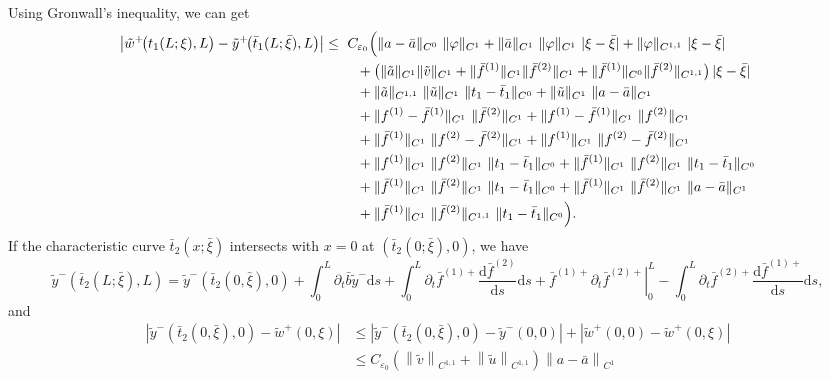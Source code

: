 \documentclass[a4paper,reqno,11pt]{amsart}
\numberwithin{equation}{section} %
\begin{document}
Using Gronwall's inequality, we can get
\[
\begin{aligned}
\bigl|\tilde w^+\!\bigl(t_1(L;\xi),L\bigr)-\tilde y ^+\!\bigl(\bar t_1(L;\bar\xi),L\bigr)\bigr|
\le{}&\ C_{\varepsilon_0}\Bigl(
  \|a-\bar a\|_{C^{0}}\ \|\varphi\|_{C^{1}}
  + \|\bar a\|_{C^{1}}\ \|\varphi\|_{C^{1}}\ |\xi-\bar\xi|
  + \|\varphi\|_{C^{1,1}}\ |\xi-\bar\xi|
\\
&\quad
  + \bigl(\|\tilde a\|_{C^{1}}\|\tilde v\|_{C^{1}}
     + \|\bar f^{(1)}\|_{C^{1}}\|\bar f^{(2)}\|_{C^{1}}
     + \|\bar f^{(1)}\|_{C^{0}}\|\bar f^{(2)}\|_{C^{1,1}}\bigr)\,|\xi-\bar\xi|
\\
&\quad
  + \|\tilde a\|_{C^{1,1}}\ \|\tilde u\|_{C^{1}}\ \|t_1-\bar t_1\|_{C^{0}}
  + \|\tilde u\|_{C^{1}}\ \|a-\bar a\|_{C^{1}}
\\
&\quad
  + \|f^{(1)}-\bar f^{(1)}\|_{C^{1}}\ \|\bar f^{(2)}\|_{C^{1}}
  + \|f^{(1)}-\bar f^{(1)}\|_{C^{1}}\ \|f^{(2)}\|_{C^{1}}
\\
&\quad
  + \|\bar f^{(1)}\|_{C^{1}}\ \|f^{(2)}-\bar f^{(2)}\|_{C^{1}}
  + \|f^{(1)}\|_{C^{1}}\ \|f^{(2)}-\bar f^{(2)}\|_{C^{1}}
\\
&\quad
  + \|f^{(1)}\|_{C^{1}}\ \|f^{(2)}\|_{C^{1}}\ \|t_1-\bar t_1\|_{C^{0}}
  + \|\bar f^{(1)}\|_{C^{1}}\ \|f^{(2)}\|_{C^{1}}\ \|t_1-\bar t_1\|_{C^{0}}
\\
&\quad
  + \|\bar f^{(1)}\|_{C^{1}}\ \|\bar f^{(2)}\|_{C^{1}}\ \|t_1-\bar t_1\|_{C^{0}}
  + \|\bar f^{(1)}\|_{C^{1}}\ \|\bar f^{(2)}\|_{C^{1}}\ \|a-\bar a\|_{C^{1}}
\\
&\quad
  + \|\bar f^{(1)}\|_{C^{1}}\ \|\bar f^{(2)}\|_{C^{1,1}}\ \|t_1-\bar t_1\|_{C^{0}}
\Bigr).
\end{aligned}
\]
If the characteristic curve $\bar{t} _2(x;\bar{\xi}  )$ intersects with $x=0$ at $(\bar{t}_2(0;\bar{\xi} ),0)$, we have
$$
\tilde{y}^-\left( \bar{t}_2(L;\bar{\xi}),L \right) =\tilde{y}^-(\bar{t}_2(0,\bar{\xi}),0)+\int_0^L{\partial _t\bar{b}\tilde{y}^-\mathrm{d}s}+\int_0^L{\partial _t\bar{f}^{(1)+}\frac{\mathrm{d}\bar{f}^{(2)}}{\mathrm{d}s}\mathrm{d}s}+\left. \bar{f}^{(1)+}\partial _t\bar{f}^{(2)+} \right|_{0}^{L}-\int_0^L{\partial _t{\bar{f}}^{(2)+}\frac{\mathrm{d}{\bar{f}}^{(1)+}}{\mathrm{d}s}\mathrm{d}s},
$$
and
$$
\begin{aligned}
	\left| \tilde{y}^-(\bar{t}_2(0,\bar{\xi}),0)-\tilde{w}^+(0,\xi ) \right|&\le \left| \tilde{y}^-(\bar{t}_2(0,\bar{\xi}),0)-\tilde{y}^-(0,0) \right|+\left| \tilde{w}^+(0,0)-\tilde{w}^+(0,\xi ) \right|\\
	&\le C_{\varepsilon _0}\left( \left\| \tilde{v} \right\| _{C^{1,1}}+\left\| \tilde{u} \right\| _{C^{1,1}} \right) \left\| a-\bar{a} \right\| _{C^1}\\
\end{aligned}
$$
\end{document}
